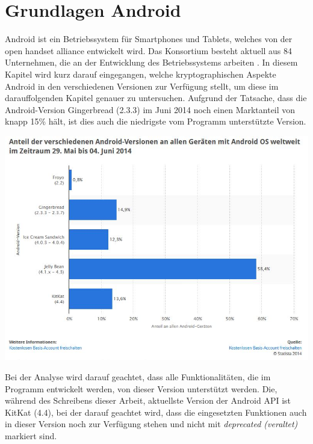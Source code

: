\documentclass[10pt, a4paper,headsepline]{scrreprt}
\begin{document}
\chapter{Grundlagen Android}
Android ist ein Betriebssystem für Smartphones und Tablets, welches von der open handset alliance entwickelt wird. Das Konsortium besteht aktuell aus 84 Unternehmen, die an der Entwicklung des Betriebssystems arbeiten \cite{website:oha-main}. 
In diesem Kapitel wird kurz darauf eingegangen, welche kryptographischen Aspekte Android in den verschiedenen Versionen zur Verfügung stellt, um diese im darauffolgenden Kapitel genauer zu untersuchen. Aufgrund der Tatsache, dass die Android-Version Gingerbread (2.3.3) im Juni 2014 noch einen Marktanteil von knapp 15\% hält, ist dies auch die niedrigste vom Programm unterstützte Version. \\

\begin{center}
\includegraphics[scale=0.6]{android_version_marktanteil.JPG} 
\end{center}
Bei der Analyse wird darauf geachtet, dass alle Funktionalitäten, die im Programm entwickelt werden, von dieser Version unterstützt werden. Die, während des Schreibens dieser Arbeit, aktuellste Version der Android API ist KitKat (4.4), bei der darauf geachtet wird, dass die eingesetzten Funktionen auch in dieser Version noch zur Verfügung stehen und nicht mit \textit{deprecated (veraltet)} markiert sind.
\end{document}
